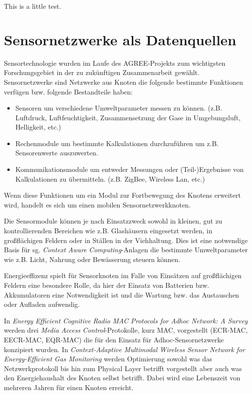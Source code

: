 This is a little test.

\section{Sensornetzwerke als Datenquellen}
Sensortechnologie wurden im Laufe des AGREE-Projekts zum wichtigsten Forschungsgebiet in der zu zukünftigen Zusammenarbeit gewählt.\cite{misc:Mikkola2013} Sensornetzwerke sind Netzwerke aus Knoten die folgende bestimmte Funktionen verfügen bzw. folgende Bestandteile haben:
\begin{itemize}
	\item Sensoren um verschiedene Umweltparameter messen zu können. (z.B. Luftdruck, Luftfeuchtigkeit, Zusammensetzung der Gase in Umgebungsluft, Helligkeit, etc.)
	\item Rechenmodule um bestimmte Kalkulationen durchzuführen um z.B. Sensorenwerte auszuwerten.
	\item Kommunikationsmodule um entweder Messungen oder (Teil-)Ergebnisse von Kalkulationen zu übermitteln. (z.B. ZigBee, Wireless Lan, etc.)
\end{itemize}
Wenn diese Funktionen um ein Modul zur Fortbewegung des Knotens erweitert wird, handelt es sich um einen mobilen Sensornetzwerkknoten.\cite{jour:Howard2002}

Die Sensormodule können je nach Einsatzzweck sowohl in kleinen, gut zu kontrollierenden Bereichen wie z.B. Glashäusern eingesetzt werden, in großflächigen Feldern oder in Ställen in der Viehhaltung. Dies ist eine notwendige Basis für sg. \textit{Context Aware Computing}-Anlagen die bestimmte Umweltparameter wie z.B. Licht, Nahrung oder Bewässerung steuern können. 

Energieeffizenz spielt für Sensorknoten im Falle von Einsätzen auf großflächigen Feldern eine besondere Rolle, da hier der Einsatz von Batterien bzw. Akkumulatoren eine Notwendigkeit ist und die Wartung bzw. das Austauschen oder Aufladen aufwendig. 

In \textit{Energy Efficient Cognitive Radio MAC Protocols for Adhoc Network: A Survey} werden drei \textit{Media Access Control}-Protokolle, kurz MAC, vorgestellt (ECR-MAC, EECR-MAC, EQR-MAC) die für den Einsatz für Adhoc-Sensornetzwerke konzipiert wurden.\cite{conf:Zia2013} In \textit{Context-Adaptive Multimodal Wireless Sensor
Network for Energy-Efficient Gas Monitoring} werden Optimierung sowohl was das Netzwerkprotokoll bis hin zum Physical Layer betrifft vorgestellt aber auch was den Energiehaushalt des Knoten selbst betrifft. Dabei wird eine Lebenszeit von mehreren Jahren für einen Knoten erreicht.\cite{jour:Jelicic2013}

